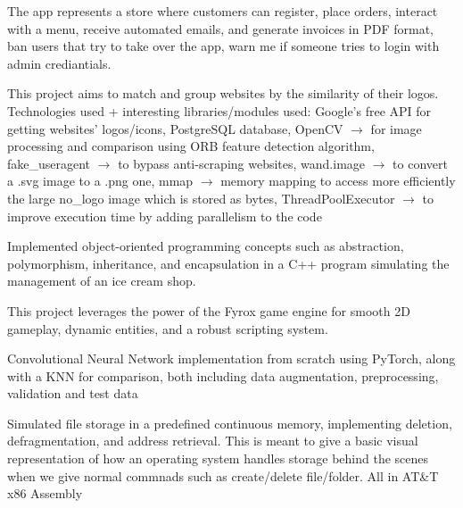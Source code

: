 \documentclass[letterpaper]{twentysecondcv} %
\begin{document}
\begin{twenty} %

    {The app represents a store where customers can register, place orders, interact with a menu, receive automated emails, and generate invoices in PDF format, ban users that try to take over the app, warn me if someone tries to login with admin crediantials.}

    {This project aims to match and group websites by the similarity of their logos. Technologies used + interesting libraries/modules used: Google's free API for getting websites' logos/icons, PostgreSQL database, OpenCV $\rightarrow$ for image processing and comparison using ORB feature detection algorithm, fake\_useragent $\rightarrow$ to bypass anti-scraping websites, wand.image $\rightarrow$ to convert a .svg image to a .png one, mmap $\rightarrow$ memory mapping to access more efficiently the large no\_logo image which is stored as bytes, ThreadPoolExecutor $\rightarrow$ to improve execution time by adding parallelism to the code}

    {Implemented object-oriented programming concepts such as abstraction, polymorphism, inheritance, and encapsulation in a C++ program simulating the management of an ice cream shop.}

    {This project leverages the power of the Fyrox game engine for smooth 2D gameplay, dynamic entities, and a robust scripting system.}

    { Convolutional Neural Network implementation from scratch using PyTorch, along with a KNN for comparison, both including data augmentation, preprocessing, validation and test data }

    {Simulated file storage in a predefined continuous memory, implementing deletion, defragmentation, and address retrieval. This is meant to give a basic visual representation of how an operating system handles storage behind the scenes when we give normal commnads such as create/delete file/folder. All in AT\&T x86 Assembly}

\end{twenty}
\end{document}
